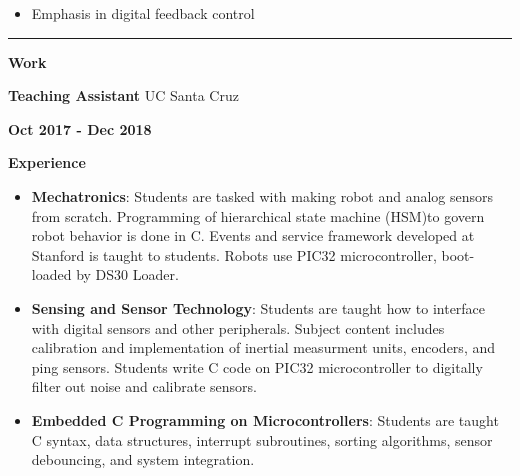 \documentclass[paper=a4,fontsize=11pt]{article} %
\def \leftColSpace      {0.1}       %
\def \middleColSpace    {0.73}       %
\def \bigMiddleColSpace {0.8}       %
\def \rightColSpace     {0.25}      %
\def \lineWidth         {20.25cm}   %
\def \lineThickness     {1pt}     %
\begin{document}
    \noindent
    \begin{minipage}[t]{\leftColSpace\linewidth}
        \hfill
    \end{minipage}
    \begin{minipage}[t]{\bigMiddleColSpace\linewidth}
        \begin{itemize}[noitemsep,topsep=0pt]
            \item Emphasis in digital feedback control
        \end{itemize}
    \end{minipage}
    \vspace{-0.275cm}

    \noindent\rule{\lineWidth}{\lineThickness}

    \noindent
    \begin{minipage}[t]{\leftColSpace\linewidth}
        \noindent \textbf{Work}
    \end{minipage}
    \begin{minipage}[t]{\middleColSpace\linewidth}
        \noindent \textbf{Teaching Assistant} \quad UC Santa Cruz
    \end{minipage}
    \begin{minipage}[t]{\rightColSpace\linewidth}
        \noindent \textbf{Oct 2017 - Dec 2018}
    \end{minipage}

    \noindent
    \begin{minipage}[t]{\leftColSpace\linewidth}
        \noindent \textbf{Experience}
    \end{minipage}
    \begin{minipage}[t]{\bigMiddleColSpace\linewidth}
        \begin{itemize}[noitemsep,topsep=0pt]
            \item \textbf{Mechatronics}: Students are tasked with making robot and analog sensors from scratch. Programming of hierarchical state machine (HSM)to govern robot behavior is done in C. Events and service framework developed at Stanford is taught to students. Robots use PIC32 microcontroller, boot-loaded by DS30 Loader.
            \item \textbf{Sensing and Sensor Technology}: Students are taught how to interface with digital sensors and other peripherals. Subject content includes calibration and implementation of inertial measurment units, encoders, and ping sensors. Students write C code on PIC32 microcontroller to digitally filter out noise and calibrate sensors.
            \item \textbf{Embedded C Programming on Microcontrollers}: Students are taught C syntax, data structures, interrupt subroutines, sorting algorithms, sensor debouncing, and system integration.
        \end{itemize}
    \end{minipage}
\end{document}
